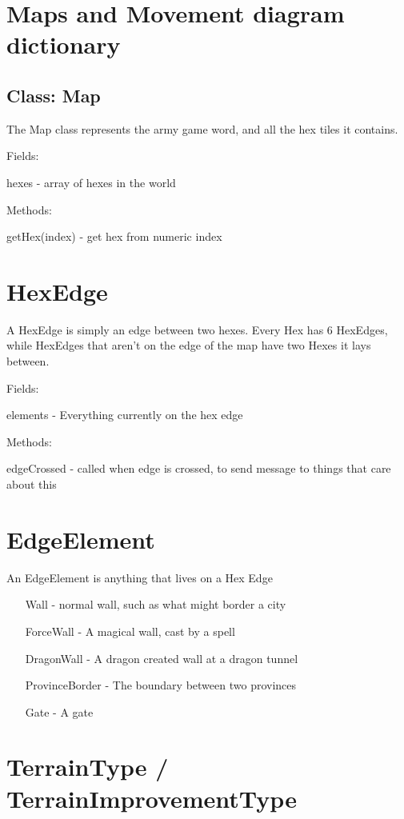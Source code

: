 \section*{Maps and Movement diagram dictionary}

\subsection*{Class: Map}
The Map class represents the army game word, and all the hex tiles it contains.
\begin{al}
	\item[Fields:] \parbox{\textwidth}{hexes - array of hexes in the world}
	\item[Methods:]	\parbox{\textwidth}{getHex(index) - get hex from numeric index}
\end{al}

\section*{HexEdge}
A HexEdge is simply an edge between two hexes. Every Hex has 6 HexEdges, while
HexEdges that aren't on the edge of the map have two Hexes it lays between.

\begin{al}
	\item[Fields:] \parbox{\textwidth}{elements - Everything currently on the hex edge}
	\item[Methods:]	\parbox{\textwidth}{edgeCrossed - called when edge is crossed, to send message to things that care about this}
\end{al}

\section*{EdgeElement}
An EdgeElement is anything that lives on a Hex Edge
\begin{enumerate}
\item[Wall] - normal wall, such as what might border a city
\item[ForceWall] - A magical wall, cast by a spell
\item[DragonWall] - A dragon created wall at a dragon tunnel
\item[ProvinceBorder] - The boundary between two provinces
\item[Gate] - A gate
\end{enumerate}

\section*{TerrainType / TerrainImprovementType}

